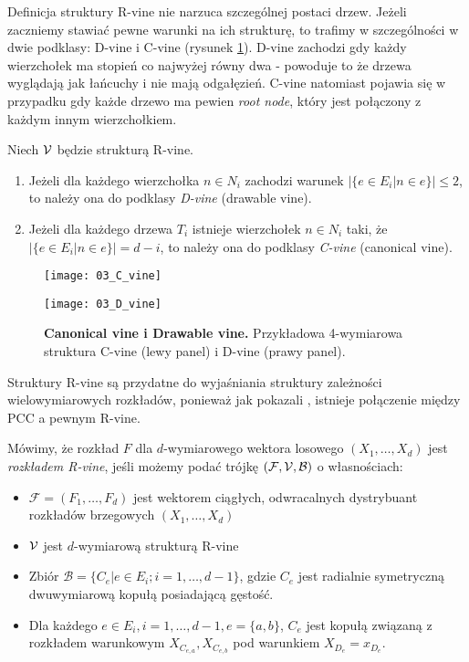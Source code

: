 Definicja struktury R-vine nie narzuca szczególnej postaci drzew. Jeżeli zaczniemy stawiać pewne warunki na ich strukturę, to trafimy w szczególności w dwie podklasy: D-vine i C-vine (rysunek \ref{fig:d_vine_c_vine}). D-vine zachodzi gdy każdy wierzchołek ma stopień co najwyżej równy dwa - powoduje to że drzewa wyglądają jak łańcuchy i nie mają odgałęzień. C-vine natomiast pojawia się w przypadku gdy każde drzewo ma pewien \emph{root node}, który jest połączony z każdym innym wierzchołkiem.
\begin{df}
	Niech $\mathcal{V}$ będzie strukturą R-vine.
	\begin{enumerate}
		\item Jeżeli dla każdego wierzchołka $n\in N_i$ zachodzi warunek $\vert \{e\in E_i\vert n\in e\}\vert \leqslant 2$, to należy ona do podklasy \emph{D-vine} (drawable vine).
		\item Jeżeli dla każdego drzewa $T_i$ istnieje wierzchołek $n\in N_i$ taki, że $\vert \{e\in E_i\vert n\in e\}\vert = d-i$, to należy ona do podklasy \emph{C-vine} (canonical vine).
	\end{enumerate}
\end{df}


\begin{figure}[h]
	\centering
	\begin{minipage}{0.35\linewidth}
	\texttt{[image: 03\_C\_vine]}
	\end{minipage}	
	\begin{minipage}{0.45\linewidth}
	\texttt{[image: 03\_D\_vine]}
	\end{minipage}	

	\caption{\textbf{Canonical vine i Drawable vine.} Przykładowa 4-wymiarowa struktura C-vine (lewy panel) i D-vine (prawy panel).\label{fig:d_vine_c_vine}}
\end{figure}

Struktury R-vine są przydatne do wyjaśniania struktury zależności wielowymiarowych rozkładów, ponieważ jak pokazali \cite{BedfordCooke2002}, istnieje połączenie między PCC a pewnym R-vine.

\begin{df}
	Mówimy, że rozkład $F$ dla $d$-wymiarowego wektora losowego $(X_1, \dots, X_d)$ jest \emph{rozkładem R-vine}, jeśli możemy podać trójkę $(\mathcal{F}, \mathcal{V}, \mathcal{B})$ o własnościach:
	\begin{itemize}
		\item $\mathcal{F} =(F_1, \dots, F_d)$ jest wektorem ciągłych, odwracalnych dystrybuant rozkładów brzegowych $(X_1, \dots, X_d)$
		\item $\mathcal{V}$ jest $d$-wymiarową strukturą R-vine 
		\item Zbiór $\mathcal{B} = \{C_e\vert e \in E_i; i=1,\dots,d-1\}$, gdzie $C_e$ jest radialnie symetryczną dwuwymiarową kopułą posiadającą gęstość.
		\item Dla każdego $e\in E_i, i=1, \dots, d-1, e=\{a,b\}$, $C_e$ jest kopułą związaną z rozkładem warunkowym $X_{C_{e, a}}, X_{C_{e, b}}$ pod warunkiem $X_{D_e} = x_{D_e}$.
	\end{itemize}
	\label{def:r_vine_distribution}
\end{df}

